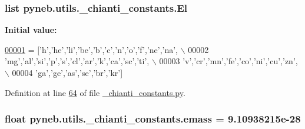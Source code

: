 \subsubsection[{El}]{\setlength{\rightskip}{0pt plus 5cm}list pyneb.\+utils.\+\_\+chianti\+\_\+constants.\+El}\label{namespacepyneb_1_1utils_1_1__chianti__constants_ab3931b9eb84335e5e2051b39a17271ad}
{\bfseries Initial value\+:}
\begin{DoxyCode}
\hypertarget{namespacepyneb_1_1utils_1_1__chianti__constants_l00001}{}\hyperlink{namespacepyneb_1_1utils_1_1__chianti__constants}{00001} = [\textcolor{stringliteral}{'h'},\textcolor{stringliteral}{'he'},\textcolor{stringliteral}{'li'},\textcolor{stringliteral}{'be'},\textcolor{stringliteral}{'b'},\textcolor{stringliteral}{'c'},\textcolor{stringliteral}{'n'},\textcolor{stringliteral}{'o'},\textcolor{stringliteral}{'f'},\textcolor{stringliteral}{'ne'},\textcolor{stringliteral}{'na'}, \(\backslash\)
00002     \textcolor{stringliteral}{'mg'},\textcolor{stringliteral}{'al'},\textcolor{stringliteral}{'si'},\textcolor{stringliteral}{'p'},\textcolor{stringliteral}{'s'},\textcolor{stringliteral}{'cl'},\textcolor{stringliteral}{'ar'},\textcolor{stringliteral}{'k'},\textcolor{stringliteral}{'ca'},\textcolor{stringliteral}{'sc'},\textcolor{stringliteral}{'ti'}, \(\backslash\)
00003     \textcolor{stringliteral}{'v'},\textcolor{stringliteral}{'cr'},\textcolor{stringliteral}{'mn'},\textcolor{stringliteral}{'fe'},\textcolor{stringliteral}{'co'},\textcolor{stringliteral}{'ni'},\textcolor{stringliteral}{'cu'},\textcolor{stringliteral}{'zn'},\(\backslash\)
00004     \textcolor{stringliteral}{'ga'},\textcolor{stringliteral}{'ge'},\textcolor{stringliteral}{'as'},\textcolor{stringliteral}{'se'},\textcolor{stringliteral}{'br'},\textcolor{stringliteral}{'kr'}]
\end{DoxyCode}


Definition at line \hyperlink{__chianti__constants_8py_source_l00064}{64} of file \hyperlink{__chianti__constants_8py_source}{\+\_\+chianti\+\_\+constants.\+py}.

\hypertarget{namespacepyneb_1_1utils_1_1__chianti__constants_ada1da9d68e6dc1c8850ae6d4336cc677}{}
\subsubsection[{emass}]{\setlength{\rightskip}{0pt plus 5cm}float pyneb.\+utils.\+\_\+chianti\+\_\+constants.\+emass = 9.\+10938215e-\/28}\label{namespacepyneb_1_1utils_1_1__chianti__constants_ada1da9d68e6dc1c8850ae6d4336cc677}


